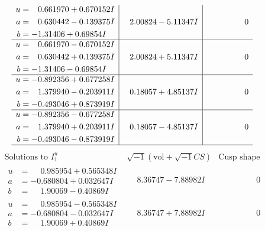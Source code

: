 \documentclass[1p]{elsarticle_modified}
\theoremstyle{definition}
\newcommand{\I}{\sqrt{-1}}
\begin{document}
$$\begin{array}{c|c|c}
\begin{aligned}
u &= \phantom{-}0.661970 + 0.670152 I \\
a &= \phantom{-}0.630442 - 0.139375 I \\
b &= -1.31406 + 0.69854 I\end{aligned}
 & \phantom{-}2.00824 - 5.11347 I & \phantom{-0.000000 } 0 \\ \hline\begin{aligned}
u &= \phantom{-}0.661970 - 0.670152 I \\
a &= \phantom{-}0.630442 + 0.139375 I \\
b &= -1.31406 - 0.69854 I\end{aligned}
 & \phantom{-}2.00824 + 5.11347 I & \phantom{-0.000000 } 0 \\ \hline\begin{aligned}
u &= -0.892356 + 0.677258 I \\
a &= \phantom{-}1.379940 - 0.203911 I \\
b &= -0.493046 + 0.873919 I\end{aligned}
 & \phantom{-}0.18057 + 4.85137 I & \phantom{-0.000000 } 0 \\ \hline\begin{aligned}
u &= -0.892356 - 0.677258 I \\
a &= \phantom{-}1.379940 + 0.203911 I \\
b &= -0.493046 - 0.873919 I\end{aligned}
 & \phantom{-}0.18057 - 4.85137 I & \phantom{-0.000000 } 0\\
 \hline 
 \end{array}$$\newpage$$\begin{array}{c|c|c}  
\text{Solutions to }I^u_{1}& \I (\text{vol} + \sqrt{-1}CS) & \text{Cusp shape}\\
 \hline 
\begin{aligned}
u &= \phantom{-}0.985954 + 0.565348 I \\
a &= -0.680804 + 0.032647 I \\
b &= \phantom{-}1.90069 - 0.40869 I\end{aligned}
 & \phantom{-}8.36747 - 7.88982 I & \phantom{-0.000000 } 0 \\ \hline\begin{aligned}
u &= \phantom{-}0.985954 - 0.565348 I \\
a &= -0.680804 - 0.032647 I \\
b &= \phantom{-}1.90069 + 0.40869 I\end{aligned}
 & \phantom{-}8.36747 + 7.88982 I & \phantom{-0.000000 } 0 \\ \hline\begin{aligned}

\end{aligned}
\end{array}$$
\end{document}
